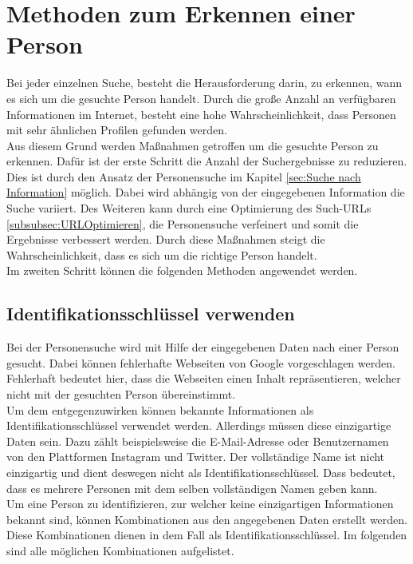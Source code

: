 \section{Methoden zum Erkennen einer Person}
\label{sec:WannhandeltessichumdiegesuchtePerson}
Bei jeder einzelnen Suche, besteht die Herausforderung darin, zu erkennen, wann es sich um die gesuchte Person handelt. Durch die große Anzahl an verfügbaren Informationen im Internet, besteht eine hohe Wahrscheinlichkeit, dass Personen mit sehr ähnlichen Profilen gefunden werden.\\
Aus diesem Grund werden Maßnahmen getroffen um die gesuchte Person zu erkennen. Dafür ist der erste Schritt die Anzahl der Suchergebnisse zu reduzieren. Dies ist durch den Ansatz der Personensuche im Kapitel \ref{sec:Suche nach Information} möglich. Dabei wird abhängig von der eingegebenen Information die Suche variiert. Des Weiteren kann durch eine Optimierung des Such-URLs \ref{subsubsec:URLOptimieren}, die Personensuche verfeinert und somit die Ergebnisse verbessert werden. Durch diese Maßnahmen steigt die Wahrscheinlichkeit, dass es sich um die richtige Person handelt.\\
Im zweiten Schritt können die folgenden Methoden angewendet werden.

	\subsection{Identifikationsschlüssel verwenden}
	\label{subsec:VorlaeufigInhaltskontrolle}
	Bei der Personensuche wird mit Hilfe der eingegebenen Daten nach einer Person gesucht. Dabei können fehlerhafte Webseiten von Google vorgeschlagen werden. Fehlerhaft bedeutet hier, dass die Webseiten einen Inhalt repräsentieren, welcher nicht mit der gesuchten Person übereinstimmt.\\ 
	Um dem entgegenzuwirken können bekannte Informationen als Identifikationsschlüssel verwendet werden. Allerdings müssen diese einzigartige Daten sein. Dazu zählt beispielsweise die E-Mail-Adresse oder Benutzernamen von den Plattformen Instagram und Twitter. Der vollständige Name ist nicht einzigartig und dient deswegen nicht als Identifikationsschlüssel. Dass bedeutet, dass es mehrere Personen mit dem selben vollständigen Namen geben kann.\\
	Um eine Person zu identifizieren, zur welcher keine einzigartigen Informationen bekannt sind, können Kombinationen aus den angegebenen Daten erstellt werden. Diese Kombinationen dienen in dem Fall als Identifikationsschlüssel. Im folgenden sind alle möglichen Kombinationen aufgelistet.
	
